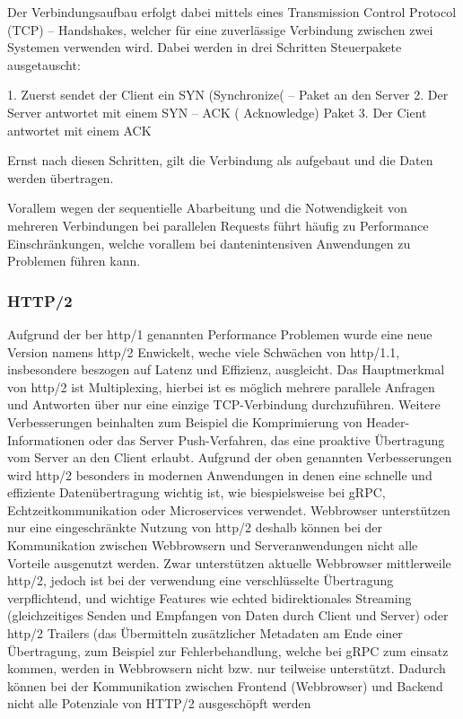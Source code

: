 Der Verbindungsaufbau erfolgt dabei mittels eines Transmission Control Protocol  (TCP) – Handshakes, welcher für eine zuverlässige Verbindung zwischen zwei Systemen verwenden wird. Dabei werden in drei Schritten Steuerpakete ausgetauscht:

1. Zuerst sendet der Client ein SYN (Synchronize( – Paket an den Server
2. Der Server antwortet mit einem SYN – ACK ( Acknowledge) Paket
3. Der Cient antwortet mit einem ACK

Ernst nach diesen Schritten, gilt die Verbindung als aufgebaut und die Daten werden übertragen.

Vorallem wegen der sequentielle Abarbeitung  und die Notwendigkeit von mehreren Verbindungen bei parallelen Requests führt häufig zu Performance Einschränkungen, welche vorallem bei dantenintensiven Anwendungen zu Problemen führen kann. 


\subsubsection{HTTP/2}
Aufgrund der ber http/1 genannten Performance Problemen wurde eine neue Version namens http/2 Enwickelt, weche viele Schwächen von http/1.1, insbesondere beszogen auf Latenz und Effizienz, ausgleicht.
Das Hauptmerkmal von http/2 ist Multiplexing, hierbei ist es möglich mehrere parallele Anfragen und Antworten über nur eine einzige TCP-Verbindung durchzuführen.
Weitere Verbesserungen beinhalten zum Beispiel die Komprimierung von Header-Informationen oder das Server Push-Verfahren, das eine proaktive Übertragung vom Server an den Client erlaubt.
Aufgrund der oben genannten Verbesserungen wird http/2 besonders in modernen Anwendungen in denen eine schnelle und effiziente Datenübertragung wichtig ist, wie biespielsweise bei gRPC, Echtzeitkommunikation oder Microservices verwendet.
Webbrowser unterstützen nur eine eingeschränkte Nutzung von http/2 deshalb können bei der Kommunikation zwischen Webbrowsern und Serveranwendungen nicht alle Vorteile ausgenutzt werden. Zwar unterstützen aktuelle Webbrowser mittlerweile http/2, jedoch ist bei der verwendung eine verschlüsselte Übertragung verpflichtend, und wichtige Features wie echted bidirektionales Streaming (gleichzeitiges Senden und Empfangen von Daten durch Client und Server) oder http/2 Trailers (das Übermitteln zusätzlicher Metadaten am Ende einer Übertragung, zum Beispiel zur Fehlerbehandlung, welche bei gRPC zum einsatz kommen, werden in Webbrowsern nicht bzw. nur teilweise unterstützt. Dadurch können bei der Kommunikation zwischen Frontend (Webbrowser) und Backend nicht alle Potenziale von HTTP/2 ausgeschöpft werden 

